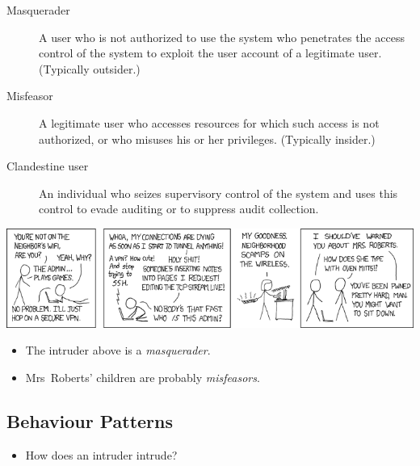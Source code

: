 \begin{frame}
  \begin{definition}[Intruders]
    \begin{description}
      \item[Masquerader] A user who is not authorized to use the system who 
        penetrates the access control of the system to exploit the user account 
        of a legitimate user.
        (Typically outsider.)

      \item[Misfeasor] A legitimate user who accesses resources for which such 
        access is not authorized, or who misuses his or her privileges.
        (Typically insider.)

      \item[Clandestine user] An individual who seizes supervisory control of 
        the system and uses this control to evade auditing or to suppress audit 
        collection.
    \end{description}
  \end{definition}
\end{frame}

\begin{frame}
  \includegraphics[width=\columnwidth]{figs/xkcd-341.png}
  \begin{example}
    \begin{itemize}
      \item The intruder above is a \emph{masquerader}.
      \item Mrs~Roberts' children are probably \emph{misfeasors}.
    \end{itemize}
  \end{example}
\end{frame}

\subsection{Behaviour Patterns}

\begin{frame}
  \begin{question}
    \begin{itemize}
      \item How does an intruder intrude?
    \end{itemize}
  \end{question}
\end{frame}

